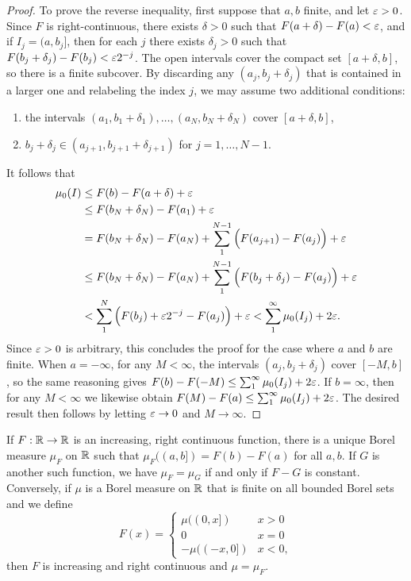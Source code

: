\documentclass[12pt]{article} %
\begin{document}
\begin{proof}
    To prove the reverse inequality, first suppose that $a, b$ finite, and let $\varepsilon > 0$. Since $F$ is right-continuous, there exists $\delta > 0$ such that $F(a + \delta) - F(a) < \varepsilon$, and if $I_j = (a, b_j]$, then for each $j$ there exists $\delta_j > 0$ such that $F(b_j + \delta_j) - F(b_j) < \varepsilon2^{-j}$. The open intervals cover the compact set $[a + \delta, b]$, so there is a finite subcover. By discarding any $(a_j, b_j + \delta_j)$ that is contained in a larger one and relabeling the index $j$, we may assume two additional conditions: \begin{enumerate}
        \item the intervals $(a_1, b_1 + \delta_1), \ldots, (a_N, b_N + \delta_N)$ cover $[a + \delta, b]$,
        \item $b_j + \delta_j \in (a_{j+1}, b_{j+1} + \delta_{j+1})$ for $j = 1, \ldots, N-1$.
    \end{enumerate}
    It follows that \begin{align*}
        \mu_0(I) &\leq F(b) - F(a + \delta) + \varepsilon\\
        &\leq F(b_N + \delta_N) - F(a_1) + \varepsilon\\
        &= F(b_N + \delta_N) - F(a_N) + \sum_1^{N-1} \Big( F(a_{j+1}) - F(a_j) \Big) + \varepsilon\\
        &\leq F(b_N + \delta_N) - F(a_N) + \sum_1^{N-1} \Big( F(b_{j} + \delta_j) - F(a_j) \Big) + \varepsilon\\
        &< \sum_1^N \Big( F(b_j) + \varepsilon 2^{-j} - F(a_j) \Big) + \varepsilon < \sum_1^\infty \mu_0(I_j) + 2 \varepsilon.
    \end{align*}
    Since $\varepsilon > 0$ is arbitrary, this concludes the proof for the case where $a$ and $b$ are finite. When $a = -\infty$, for any $M < \infty$, the intervals $(a_j, b_j + \delta_j)$ cover $[-M, b]$, so the same reasoning gives $F(b) - F(-M) \leq \sum_1^\infty \mu_0(I_j) + 2\varepsilon$. If $b = \infty$, then for any $M < \infty$ we likewise obtain $F(M) - F(a) \leq \sum_1^\infty \mu_0(I_j) + 2\varepsilon$. The desired result then follows by letting $\varepsilon \to 0$ and $M \to \infty$.
\end{proof}

\begin{theorem}\label{thm:borel-measure-correspondence}
    If $F : \mathbb{R} \to \mathbb{R}$ is an increasing, right continuous function, there is a unique Borel measure $\mu_F$ on $\mathbb{R}$ such that $\mu_F((a, b]) = F(b) - F(a)$ for all $a, b$. If $G$ is another such function, we have $\mu_F = \mu_G$ if and only if $F - G$ is constant. Conversely, if $\mu$ is a Borel measure on $\mathbb{R}$ that is finite on all bounded Borel sets and we define \[F(x) = \begin{cases}
        \mu((0, x]) &x > 0\\
        0 &x = 0\\
        -\mu((-x, 0]) &x < 0,
    \end{cases}
    \] then $F$ is increasing and right continuous and $\mu = \mu_F$.
\end{theorem}
\end{document}
